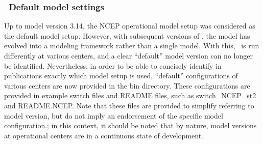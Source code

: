 \vsssub
\subsubsection{~Default model settings} \label{sub:opt_default}
\vsssub

Up to model version 3.14, the NCEP operational model setup was considered as
the default model setup. However, with subsequent versions of \ws, the model
has evolved into a modeling framework rather than a single model. With this,
\ws\ is run differently at various centers, and a clear ``default'' model
version can no longer be identified.  Nevertheless, in order to be able to
concisely identify in publications exactly which model setup is used,
``default'' configurations of various centers are now provided in the {\file
bin} directory. These configurations are provided in example switch files and
README files, such as {\file switch\_NCEP\_st2} and {\file README.NCEP}. Note
that these files are provided to simplify referring to model version, but do
not imply an endorsement of the specific model configuration.; in this
context, it should be noted that by nature, model versions at operational
centers are in a continuous state of development.




